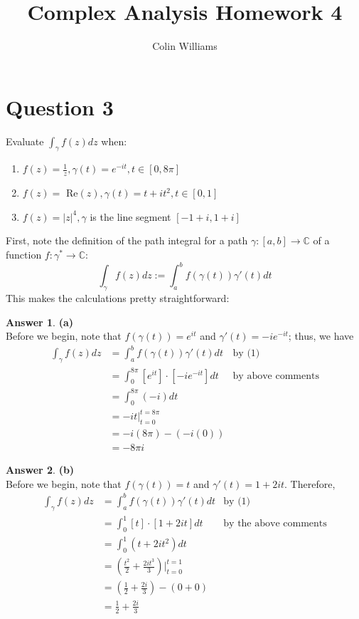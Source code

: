 \documentclass[10pt,a4paper]{article}
\title{Complex Analysis Homework 4}
\author{Colin Williams}
\theoremstyle{definition}
\newtheorem*{answer*}{Answer}
\begin{document}
\maketitle

\section*{Question 3}

Evaluate $\displaystyle \int_{\gamma} f(z)dz$ when:
\begin{enumerate}[label = (\alph*)]
\item $f(z) = \frac{1}{z}, \gamma(t) = e^{-it}, t \in [0, 8\pi]$
\item $f(z) = $ Re$(z), \gamma(t) = t + it^2, t \in [0,1]$
\item $f(z) = |z|^4, \gamma$ is the line segment $[-1+i, 1 +i]$
\end{enumerate}
$ $
\\First, note the definition of the path integral for a path $\gamma : [a,b] \to \mathbb{C}$ of a function $f: \gamma^* \to \mathbb{C}$:
\begin{equation}
\int_{\gamma}f(z)dz := \int_a^b f(\gamma(t))\gamma '(t)dt
\end{equation}
This makes the calculations pretty straightforward:
\begin{answer*}{\textbf{(a)}}
\\Before we begin, note that $f(\gamma(t)) = e^{it}$ and $\gamma '(t) = -ie^{-it}$; thus, we have
\begin{align*}
\int_{\gamma} f(z)dz &= \int_a^b f(\gamma(t))\gamma '(t)dt &\text{by (1)}\\
&= \int_0^{8\pi} [e^{it}]\cdot[-ie^{-it}]dt &\text{by above comments}\\
&= \int_0^{8\pi} (-i) dt\\
&= -it \Big|_{t = 0}^{t = 8\pi}\\
&= -i(8\pi) - (-i(0))\\
&= \boxed{-8\pi i}
\end{align*}
\end{answer*}

\begin{answer*}{\textbf{(b)}}
\\Before we begin, note that $f(\gamma(t)) = t$ and $\gamma '(t) = 1 + 2it$. Therefore,
\begin{align*}
\int_{\gamma} f(z)dz &= \int_a^b f(\gamma(t))\gamma '(t)dt &\text{by (1)}\\
&= \int_0^1 [t]\cdot[1 + 2it]dt &\text{by the above comments}\\
&= \int_0^1 (t + 2it^2)dt\\
&= \left(\frac{t^2}{2} + \frac{2it^3}{3}\right) \bigg|_{t = 0}^{t = 1}\\
&= \left(\frac{1}{2} + \frac{2i}{3}\right) - (0 + 0)\\
&= \boxed{\frac{1}{2} + \frac{2i}{3}}
\end{align*}
\end{answer*}
\end{document}
